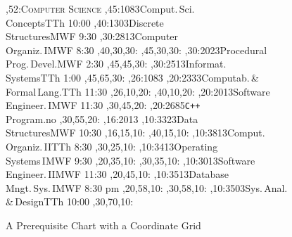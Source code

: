 \begin{figure}
\small
\setcounter{diagheight}{50}
\textwidth6.25in
\begin{chart}\sf
\grid
{},52:{\textsf{\textsc{\Large Computer Science}}}
,45:{1083}{Comput.\,Sci.\\Concepts}{TTh 10:00}
,40:{1303}{Discrete\\Structures}{MWF 9:30}
,30:{2813}{Computer\\Organiz.\,I}{MWF 8:30}
  ,40,30,30:
  ,45,30,30:
,30:{2023}{Procedural\\Prog.\,Devel.}{MWF 2:30}
  ,45,45,30:
,30:{2513}{Informat.\\Systems}{TTh 1:00}
  ,45,65,30:
,26:{1083}
,20:{2333}{Computab.\,\&\\Formal\,Lang.}{TTh 11:30}
  ,26,10,20:
  ,40,10,20:
,20:{2013}{Software\\Engineer.\,I}{MWF 11:30}
  ,30,45,20:
,20:{2685}{\texttt{C++}\\Program.}{no}
  ,30,55,20:
,16:{2013}
,10:{3323}{Data\\Structures}{MWF 10:30}
  ,16,15,10:
  ,40,15,10:
,10:{3813}{Comput.\\Organiz.\,II}{TTh 8:30}
  ,30,25,10:
,10:{3413}{Operating\\Systems\,I}{MWF 9:30}
  ,20,35,10:
  ,30,35,10:
,10:{3013}{Software\\Engineer.\,II}{MWF 11:30}
  ,20,45,10:
,10:{3513}{Database\\Mngt.\,Sys.\,I}{MWF 8:30 pm}
  ,20,58,10:
  ,30,58,10:
,10:{3503}{Sys.\,Anal.\\\&\,Design}{TTh 10:00}
  ,30,70,10:
\end{chart}
\vspace*{6ex}
\renewcommand{\bfdefault}{b}
\renewcommand{\mddefault}{m}
\caption{A Prerequisite Chart with a Coordinate Grid}
\label{grid}
\end{figure}
